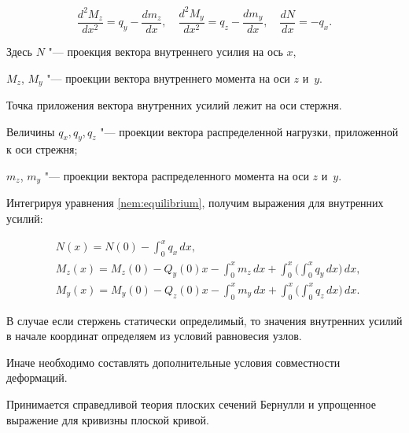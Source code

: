 \begin{equation}\label{nem:equilibrium}

\frac{d^2{}M_z}{dx^2}=q_y-\frac{dm_z}{dx},\quad

\frac{d^2{}M_y}{dx^2}=q_z-\frac{dm_y}{dx},\quad

\frac{dN}{dx}=-q_x.

\end{equation}

Здесь $N$ "---  проекция вектора внутреннего усилия на ось $x$, 

$M_z$, $M_y$ "---  проекции вектора внутреннего момента на оси $z$ и~$y$. 

Точка приложения вектора внутренних усилий лежит на оси стержня. 

Величины $q_x,{}q_y,{}q_z$ "---  проекции вектора распределенной нагрузки, приложенной к оси стрежня; 

$m_z$, $m_y$ "---  проекции вектора распределенного момента на оси $z$ и~$y$.



Интегрируя уравнения \eqref{nem:equilibrium}, получим выражения для внутренних усилий:



\begin{equation}\label{nem:equilibriumint}

\begin{aligned}

&N(x)=N(0)-\int _0^x q_x\,dx,\\

&M_z(x)=M_z(0)-Q_y(0)x-\int _0^x m_z\,dx+\int _0^x\biggl(\int _0^x q_y\,dx\biggr)\,dx,\\

&M_y(x)=M_y(0)-Q_z(0)x-\int _0^x m_y\,dx+\int _0^x\biggl(\int _0^x q_z\,dx\biggr)\,dx.\ 

\end{aligned}

\end{equation}



В случае если стержень статически определимый, то значения внутренних усилий в начале координат определяем из условий равновесия узлов. 

Иначе необходимо составлять дополнительные условия совместности деформаций.



Принимается справедливой теория плоских сечений Бернулли и упрощенное выражение для кривизны плоской кривой. 

